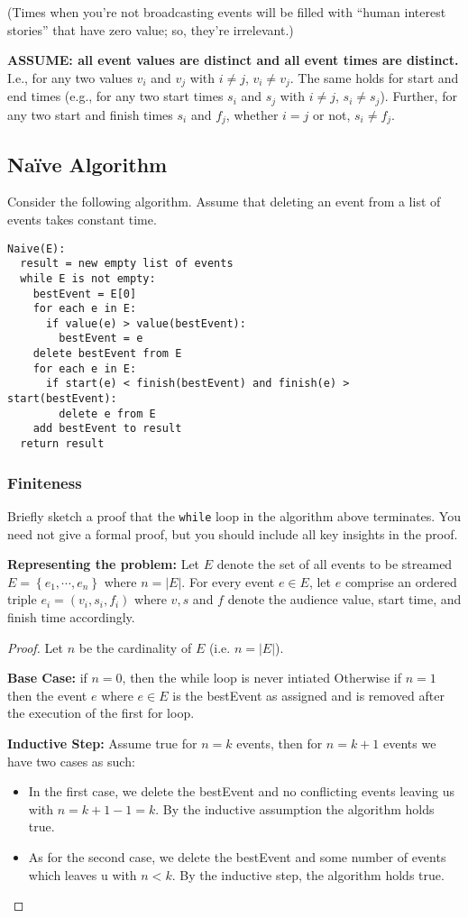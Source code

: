 \documentclass[11pt, oneside]{article}   	%
\theoremstyle{definition}
\theoremstyle{remark}
\begin{document}
(Times when you're not broadcasting events will be filled with ``human
interest stories'' that have zero value; so, they're irrelevant.)

\textbf{ASSUME: all event values are distinct and all event times are distinct.} I.e., for any two values $v_i$ and $v_j$ with $i \neq j$,
$v_i \neq v_j$. The same holds for start and end times (e.g., for any
two start times $s_i$ and $s_j$ with $i \neq j$, $s_i \neq
s_j$). Further, for any two start and finish times $s_i$ and $f_j$,
whether $i = j$ or not, $s_i \neq f_j$.
\subsection{Na\"ive Algorithm}

Consider the following algorithm. Assume that deleting an event from a
list of events takes constant time.

\begin{verbatim}
Naive(E):
  result = new empty list of events
  while E is not empty:
    bestEvent = E[0]
    for each e in E:
      if value(e) > value(bestEvent):
        bestEvent = e
    delete bestEvent from E
    for each e in E:
      if start(e) < finish(bestEvent) and finish(e) > start(bestEvent):
        delete e from E
    add bestEvent to result
  return result
\end{verbatim}
\subsubsection{Finiteness}

Briefly sketch a proof that the \texttt{while} loop in the algorithm above
terminates. You need not give a formal proof, but you should include
all key insights in the proof.

\textbf{Representing the problem:} Let $E$ denote the set of all events to be streamed $E=\left\{e_1, \dotsm, e_n\right\}$ where $n=|E|.$ For every event $e \in E$, let $e$ comprise an ordered triple $e_i = (v_i, s_i, f_i)$ where $v,s$ and $f$ denote the audience value, start time, and finish time accordingly.

\begin{proof}
Let $n$ be the cardinality of $E$ (i.e. $n=|E|$).

\textbf{Base Case:} if $n = 0$, then the while loop is never intiated
Otherwise if $n=1$ then the event $e$ where $e \in E$ is the bestEvent as assigned and is removed after the execution of the first for loop. 

\textbf{Inductive Step:} Assume true for $n=k$ events, then for $n=k+1$ events we have two cases as such:
\begin{itemize}
	\item In the first case, we delete the bestEvent and no conflicting events leaving us with $n=k+1-1=k$. By the inductive assumption the algorithm holds true.
	\item As for the second case, we delete the bestEvent and some number of events which leaves u with $n<k$. By the inductive step, the algorithm holds true.
\end{itemize} 
\end{proof}
\end{document}
